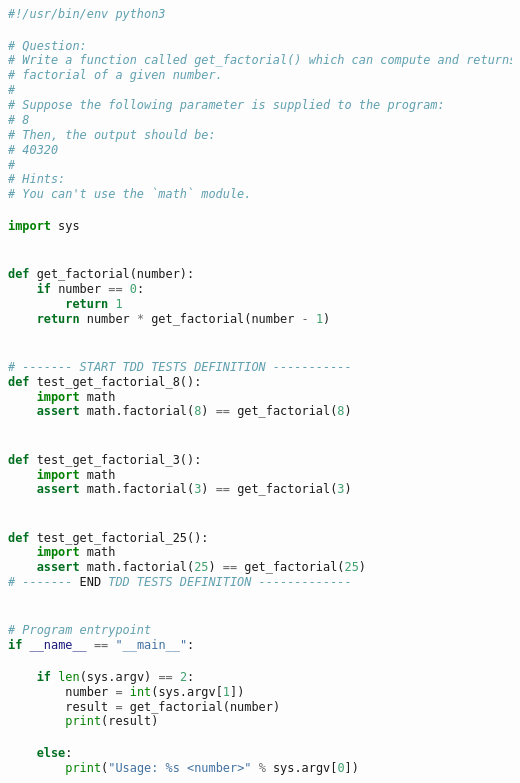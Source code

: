\begin{lstlisting}[language=python,caption={exercise\_3.py},captionpos=b]
#!/usr/bin/env python3

# Question:
# Write a function called get_factorial() which can compute and returns the
# factorial of a given number.
#
# Suppose the following parameter is supplied to the program:
# 8
# Then, the output should be:
# 40320
#
# Hints:
# You can't use the `math` module.

import sys


def get_factorial(number):
    if number == 0:
        return 1
    return number * get_factorial(number - 1)


# ------- START TDD TESTS DEFINITION -----------
def test_get_factorial_8():
    import math
    assert math.factorial(8) == get_factorial(8)


def test_get_factorial_3():
    import math
    assert math.factorial(3) == get_factorial(3)


def test_get_factorial_25():
    import math
    assert math.factorial(25) == get_factorial(25)
# ------- END TDD TESTS DEFINITION -------------


# Program entrypoint
if __name__ == "__main__":

    if len(sys.argv) == 2:
        number = int(sys.argv[1])
        result = get_factorial(number)
        print(result)

    else:
        print("Usage: %s <number>" % sys.argv[0])
\end{lstlisting}

